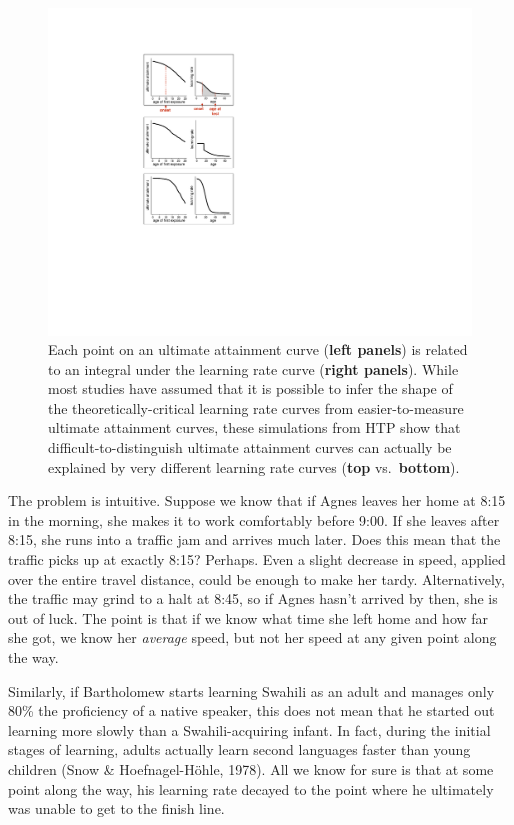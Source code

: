 \documentclass[
  english,
  doc,floatsintext]{apa6}
\begin{document}
\begin{figure}
\includegraphics[width=1.5\linewidth]{Figures/FigUA} \caption{Each point on an ultimate attainment curve (\textbf{left panels}) is related to an integral under the learning rate curve (\textbf{right panels}). While most studies have assumed that it is possible to infer the shape of the theoretically-critical learning rate curves from easier-to-measure ultimate attainment curves, these simulations from HTP show that difficult-to-distinguish ultimate attainment curves can actually be explained by very different learning rate curves (\textbf{top} vs.~\textbf{bottom}).}\label{fig:FigUA}
\end{figure}

The problem is intuitive. Suppose we know that if Agnes leaves her home at 8:15 in the morning, she makes it to work comfortably before 9:00. If she leaves after 8:15, she runs into a traffic jam and arrives much later. Does this mean that the traffic picks up at exactly 8:15? Perhaps. Even a slight decrease in speed, applied over the entire travel distance, could be enough to make her tardy. Alternatively, the traffic may grind to a halt at 8:45, so if Agnes hasn't arrived by then, she is out of luck. The point is that if we know what time she left home and how far she got, we know her \emph{average} speed, but not her speed at any given point along the way.

Similarly, if Bartholomew starts learning Swahili as an adult and manages only 80\% the proficiency of a native speaker, this does not mean that he started out learning more slowly than a Swahili-acquiring infant. In fact, during the initial stages of learning, adults actually learn second languages faster than young children (Snow \& Hoefnagel-Höhle, 1978). All we know for sure is that at some point along the way, his learning rate decayed to the point where he ultimately was unable to get to the finish line.
\end{document}
